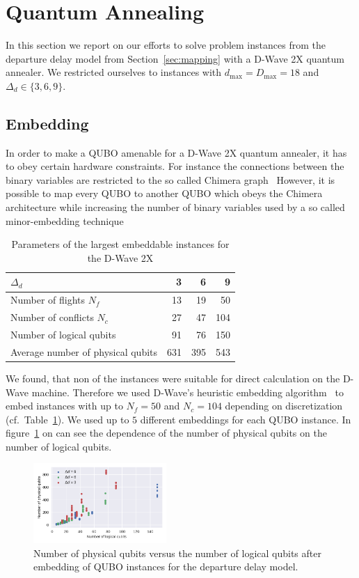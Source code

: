 \section{Quantum Annealing}
\label{sec:qa}
In this section we report on our efforts to solve problem instances from the departure delay model from Section~\ref{sec:mapping} with a D-Wave 2X quantum annealer.
We restricted ourselves to instances with $d_\text{max}=D_\text{max}=18$ and $\Delta_d \in \{3, 6, 9\}$.
\subsection{Embedding}
In order to make a QUBO amenable for a D-Wave 2X quantum annealer, it has to obey certain hardware constraints.
For instance the connections between the binary variables are restricted to the so called Chimera graph~\cite{Rieffel2015}
However, it is possible to map every QUBO to another QUBO which obeys the Chimera architecture while increasing the number of binary variables used by a so called minor-embedding technique~\cite{choi}

\begin{table}[h]
    \begin{tabular}{lrrr}
    \toprule
    $\Delta_d$ &    3 &    6 &    9 \\
    \midrule
    Number of flights $N_f$   &   13 &   19 &   50 \\
    Number of conflicts $N_c$ &   27 &   47 &  104 \\
    Number of logical qubits  &   91 &   76 &  150 \\
    Average number of physical qubits &  631 &  395 &  543 \\
    \bottomrule
    \end{tabular}
    \caption{Parameters of the largest embeddable instances for the D-Wave 2X}
\label{tab:embedding}
\end{table}

We found, that non of the instances were suitable for direct calculation on the D-Wave machine.
Therefore we used D-Wave's heuristic embedding algorithm~\cite{DWaveEmbeddingHeuristic} to embed instances with up to $N_f=50$ and $N_c=104$ depending on discretization (cf.\ Table~\ref{tab:embedding}).
We used up to $5$ different embeddings for each QUBO instance.
In figure~\ref{fig:number_of_physical_qubits} on can see the dependence of the number of physical qubits on the number of logical qubits.


\begin{figure}[htpb]
    \centering
    \includegraphics[width=0.45\textwidth]{./pics/physicalVsLogicalNumberOfQubits.pdf}
    \caption{Number of physical qubits versus the number of logical qubits after embedding of QUBO instances for the departure delay model.}
\label{fig:number_of_physical_qubits}
\end{figure}




